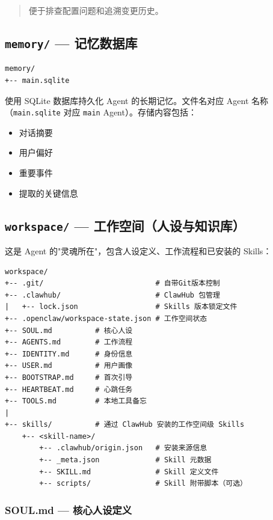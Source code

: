 \begin{quote}
便于排查配置问题和追溯变更历史。
\end{quote}

\subsection{\texttt{memory/} --- 记忆数据库}


\begin{lstlisting}
memory/
+-- main.sqlite
\end{lstlisting}

使用 SQLite 数据库持久化 Agent 的长期记忆。文件名对应 Agent 名称（\texttt{main.sqlite} 对应 \texttt{main} Agent）。存储内容包括：

\begin{itemize}
  \item 对话摘要
  \item 用户偏好
  \item 重要事件
  \item 提取的关键信息
\end{itemize}

\subsection{\texttt{workspace/} --- 工作空间（人设与知识库）}


这是 Agent 的"灵魂所在"，包含人设定义、工作流程和已安装的 Skills：

\begin{lstlisting}
workspace/
+-- .git/                          # 自带Git版本控制
+-- .clawhub/                      # ClawHub 包管理
|   +-- lock.json                  # Skills 版本锁定文件
+-- .openclaw/workspace-state.json # 工作空间状态
+-- SOUL.md          # 核心人设
+-- AGENTS.md        # 工作流程
+-- IDENTITY.md      # 身份信息
+-- USER.md          # 用户画像
+-- BOOTSTRAP.md     # 首次引导
+-- HEARTBEAT.md     # 心跳任务
+-- TOOLS.md         # 本地工具备忘
|
+-- skills/          # 通过 ClawHub 安装的工作空间级 Skills
    +-- <skill-name>/
        +-- .clawhub/origin.json   # 安装来源信息
        +-- _meta.json             # Skill 元数据
        +-- SKILL.md               # Skill 定义文件
        +-- scripts/               # Skill 附带脚本（可选）
\end{lstlisting}

\subsubsection{SOUL.md --- 核心人设定义}


